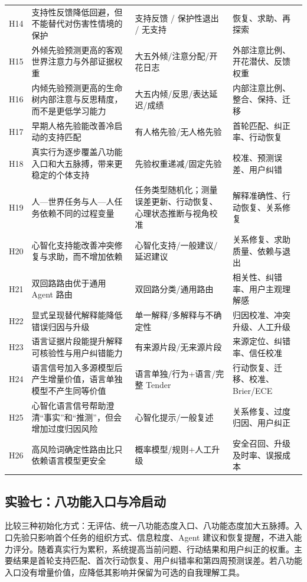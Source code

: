 \documentclass[UTF8,a4paper,11pt]{ctexart}
\begin{document}
\begin{center}
\begin{longtable}{@{}p{1.4cm}p{4.5cm}p{5.2cm}p{3.4cm}@{}}
H14 & 支持性反馈降低回避，但不能替代对伤害性情境的保护 & 支持反馈 / 保护性退出 / 无支持 & 恢复、求助、再探索 \\
H15 & 外倾先验预测更高的客观世界注意力与外部证据权重 & 大五外倾/注意分配/开花日志 & 外部注意比例、开花潜伏、反馈权重 \\
H16 & 内倾先验预测更高的生命树内部注意与反思精度，而不是更低学习能力 & 大五内倾/反思/表达延迟/成绩 & 内部注意比例、整合、保持、迁移 \\
H17 & 早期人格先验能改善冷启动的支持匹配 & 有人格先验/无人格先验 & 首轮匹配、纠正率、行动恢复 \\
H18 & 真实行为逐步覆盖八功能入口和大五脉搏，带来更稳定的个体支持 & 先验权重递减/固定先验 & 校准、预测误差、用户纠错 \\
H19 & 人—世界任务与人—人任务依赖不同的过程变量 & 任务类型随机化；测量误差更新、行动恢复、心理状态推断与视角校准 & 解释准确性、行动恢复、关系修复 \\
H20 & 心智化支持能改善冲突修复与求助，而不增加依赖 & 心智化支持/一般建议/延迟建议 & 关系修复、求助质量、依赖与退出 \\
H21 & 双回路路由优于通用 Agent 路由 & 双回路分类/通用路由 & 相关性、纠错率、用户主观理解感 \\
H22 & 显式呈现替代解释能降低错误归因与升级 & 单一解释/多解释与不确定性 & 归因校准、冲突升级、人工升级 \\
H23 & 语言证据片段能提升解释可核验性与用户纠错能力 & 有来源片段/无来源片段 & 来源定位、纠错率、信任校准 \\
H24 & 语言信号加入多源模型后产生增量价值，语言单独模型不产生同等价值 & 语言单独/行为+语言/完整 Tender & 行动恢复、迁移、校准、Brier/ECE \\
H25 & 心智化语言信号帮助澄清“事实”和“推测”，但会增加过度归因风险 & 心智化提示/一般复述 & 关系修复、过度归因、用户纠正 \\
H26 & 高风险词确定性路由比只依赖语言模型更安全 & 概率模型/规则+人工升级 & 安全召回、升级及时率、误报成本 \\
\bottomrule
\end{longtable}
\end{center}


\subsection{实验七：八功能入口与冷启动}

比较三种初始化方式：无评估、统一八功能态度入口、八功能态度加大五脉搏。入口先验只影响首个任务的组织方式、信息粒度、Agent 建议和恢复提醒，不进入能力评分。随着真实行为累积，系统提高当前问题、行动结果和用户纠正的权重。主要结果是首轮支持匹配、首次行动恢复、用户纠错率和第四周预测误差。若八功能入口没有增量价值，应降低其影响并保留为可选的自我理解工具。
\end{document}
